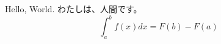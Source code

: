 \documentclass[uplatex]{jsarticle}
\begin{document}
Hello, World.
わたしは、人間です。
\begin{equation}
\int_{a}^{b} f(x)dx=F(b) -F(a)
\end{equation}
\end{document}

